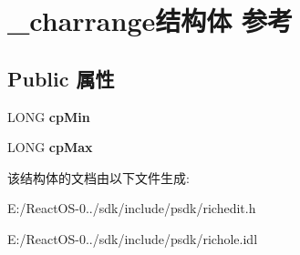 \hypertarget{struct__charrange}{}\section{\+\_\+charrange结构体 参考}
\label{struct__charrange}
\subsection*{Public 属性}
\begin{DoxyCompactItemize}
\item 
\mbox{\label{struct__charrange_ae9a540834a5b4c970b632a762e9c8348}} 
L\+O\+NG {\bfseries cp\+Min}
\item 
\mbox{\label{struct__charrange_a0d6f788935f5540a125f6c17fc94be74}} 
L\+O\+NG {\bfseries cp\+Max}
\end{DoxyCompactItemize}


该结构体的文档由以下文件生成\+:\begin{DoxyCompactItemize}
\item 
E\+:/\+React\+O\+S-\/0../sdk/include/psdk/richedit.\+h\item 
E\+:/\+React\+O\+S-\/0../sdk/include/psdk/richole.\+idl\end{DoxyCompactItemize}
